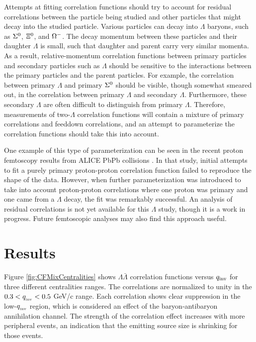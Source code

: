 {Attempts at fitting correlation functions should try to account for residual correlations between the particle being studied and other particles that might decay into the studied particle.  Various particles can decay into $\Lambda$ baryons, such as $\Sigma^{\rm 0}$, $\Xi^{\rm 0}$, and $\Omega^{\rm -}$.  The decay momentum between these particles and their daughter $\Lambda$ is small, such that daughter and parent carry very similar momenta.  As a result, relative-momentum correlation functions between primary particles and secondary particles such as $\Lambda$ should be sensitive to the interactions between the primary particles and the parent particles.  For example, the correlation between primary $\Lambda$ and primary $\Sigma^{\rm 0}$ should be visible, though somewhat smeared out, in the correlation between primary $\Lambda$ and secondary $\Lambda$.  Furthermore, these secondary $\Lambda$ are often difficult to distinguish from primary $\Lambda$.  Therefore, measurements of two-$\Lambda$ correlation functions will contain a mixture of primary correlations and feeddown correlations, and an attempt to parameterize the correlation functions should take this into account.  

One example of this type of parameterization can be seen in the recent proton femtoscopy results from ALICE PbPb collisions \cite{Szymanski:2012AN}.  In that study, initial attempts to fit a purely primary proton-proton correlation function failed to reproduce the shape of the data.  However, when further parameterization was introduced to take into account proton-proton correlations where one proton was primary and one came from a $\Lambda$ decay, the fit was remarkably successful.  An analysis of residual correlations is not yet available for this $\Lambda$ study, though it is a work in progress.  Future femtoscopic analyses may also find this approach useful.

\section{Results}
\label{sec:Results}

Figure \ref{fig:CFMixCentralities} shows $\Lambda\bar{\Lambda}$ correlation functions versus $q_{\rm inv}$ for three different centralities ranges.  The correlations are normalized to unity in the $ 0.3 < q_{\rm_{inv}} < 0.5$ GeV/c range.  Each correlation shows clear suppression in the low-$q_{\rm_{inv}}$ region, which is considered an effect of the baryon-antibaryon annihilation channel.  The strength of the correlation effect increases with more peripheral events, an indication that the emitting source size is shrinking for those events.

}
